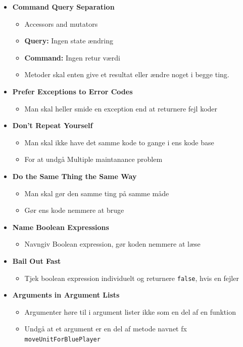 \documentclass[a4, english]{article}
\begin{document}
\begin{itemize}
\begin{itemize}
  \end{itemize}
  \item \textbf{Command Query Separation}
  \begin{itemize}
    \item Accessors and mutators
    \item \textbf{Query:} Ingen state ændring
    \item \textbf{Command:} Ingen retur værdi
  	\item Metoder skal enten give et resultat eller ændre noget i begge ting.
  \end{itemize}
  \item \textbf{Prefer Exceptions to Error Codes}
  \begin{itemize}
  	\item Man skal heller smide en exception end at returnere fejl koder
  \end{itemize}
  \item \textbf{Don't Repeat Yourself}
  \begin{itemize}
  	\item Man skal ikke have det samme kode to gange i ens kode base
    \item For at undgå Multiple maintanance problem
  \end{itemize}
  \item \textbf{Do the Same Thing the Same Way}
  \begin{itemize}
  	\item Man skal gør den samme ting på samme måde
    \item Gør ens kode nemmere at bruge 
  \end{itemize}
  \item \textbf{Name Boolean Expressions}
  \begin{itemize}
  	\item Navngiv Boolean expression, gør koden nemmere at læse 
  \end{itemize}
  \item \textbf{Bail Out Fast}
  \begin{itemize}
  	\item Tjek boolean expression individuelt og returnere \texttt{false}, hvis en fejler
  \end{itemize}
  \item \textbf{Arguments in Argument Lists}
  \begin{itemize}
  	\item Argumenter høre til i argument lister ikke som en del af en funktion
    \item Undgå at et argument er en del af metode navnet fx \texttt{moveUnitForBluePlayer}
  \end{itemize}
\end{itemize}
\end{document}
